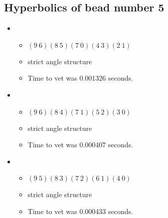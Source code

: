 \documentclass{article}
\begin{document}
\subsection{Hyperbolics of bead number 5}
\begin{itemize}
\item \begin{itemize}
      \item $(9\ 6)(8\ 5)(7\ 0)(4\ 3)(2\ 1)$
      \item strict angle structure
      \item Time to vet was 0.001326 seconds.
\end{itemize}
\item \begin{itemize}
      \item $(9\ 6)(8\ 4)(7\ 1)(5\ 2)(3\ 0)$
      \item strict angle structure
      \item Time to vet was 0.000407 seconds.
\end{itemize}
\item \begin{itemize}
      \item $(9\ 5)(8\ 3)(7\ 2)(6\ 1)(4\ 0)$
      \item strict angle structure
      \item Time to vet was 0.000433 seconds.
\end{itemize}
\end{itemize}
\end{document}
